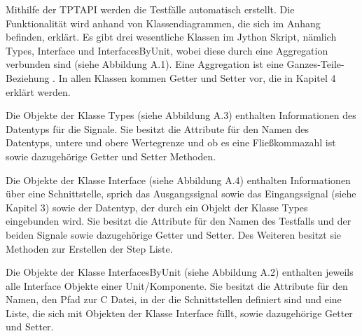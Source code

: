 Mithilfe der TPTAPI werden die Testfälle automatisch erstellt.
Die Funktionalität wird anhand von Klassendiagrammen, die sich im Anhang befinden, erklärt.
Es gibt drei wesentliche Klassen im Jython Skript, nämlich Types, Interface und InterfacesByUnit, wobei diese
durch eine Aggregation verbunden sind (siehe Abbildung A.1). Eine Aggregation ist eine Ganzes-Teile-Beziehung \cite[vgl.][S.61 f.]{integration}.
In allen Klassen kommen Getter und Setter vor, die in Kapitel 4 erklärt werden.

Die Objekte der Klasse Types (siehe Abbildung A.3) enthalten Informationen des Datentyps für die Signale.
Sie besitzt die Attribute für den Namen des Datentyps, untere und obere Wertegrenze und ob
es eine Fließkommazahl ist sowie dazugehörige Getter und Setter Methoden.

Die Objekte der Klasse Interface (siehe Abbildung A.4) enthalten Informationen über eine Schnittstelle, sprich das Ausgangssignal sowie das 
Eingangssignal (siehe Kapitel 3) sowie der Datentyp, der durch ein Objekt der Klasse Types eingebunden wird.
Sie besitzt die Attribute für den Namen des Testfalls und der beiden Signale sowie dazugehörige Getter und Setter.
Des Weiteren besitzt sie Methoden zur Erstellen der Step Liste.

Die Objekte der Klasse InterfacesByUnit (siehe Abbildung A.2) enthalten jeweils alle Interface Objekte einer Unit/Komponente.
Sie besitzt die Attribute für den Namen, den Pfad zur C Datei, in der die Schnittstellen definiert sind und
eine Liste, die sich mit Objekten der Klasse Interface füllt, sowie dazugehörige
Getter und Setter.

